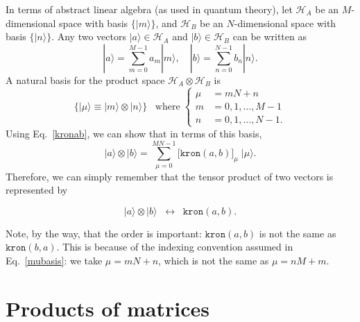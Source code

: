 \documentclass[pra,12pt]{revtex4}
\begin{document}
In terms of abstract linear algebra (as used in quantum theory), let
$\mathscr{H}_A$ be an $M$-dimensional space with basis
$\{|m\rangle\}$, and $\mathscr{H}_B$ be an $N$-dimensional space with
basis $\{|n\rangle\}$.  Any two vectors $|a\rangle \in \mathscr{H}_A$
and $|b\rangle \in \mathscr{H}_B$ can be written as
\begin{equation}
  |a\rangle = \sum_{m=0}^{M-1} a_m |m\rangle, \quad |b\rangle = \sum_{n=0}^{N-1} b_n |n\rangle.
\end{equation}
A natural basis for the product space $\mathscr{H}_A\otimes
\mathscr{H}_B$ is
\begin{equation}
  \Big\{|\mu\rangle \equiv |m\rangle\otimes |n\rangle\Big\} \;\;\;\mathrm{where} \;\begin{cases}\mu\!\!\!\! &= mN+n \\ m \!\!\!\!&= 0,1,\dots,M-1 \\ n \!\!\!\!&= 0,1, \dots, N-1.\end{cases}
  \label{mubasis}
\end{equation}
Using Eq.~\eqref{kronab}, we can show that in terms of this basis,
\begin{equation}
  |a\rangle\otimes|b\rangle = \sum_{\mu=0}^{MN-1} \big[\texttt{kron}(a,b)\big]_\mu \; |\mu\rangle.
\end{equation}
Therefore, we can simply remember that the tensor product of two
vectors is represented by
\begin{framed}
  \begin{equation}
    |a\rangle\otimes|b\rangle \;\;\leftrightarrow\;\;
    \texttt{kron}(a,b).
    \label{result1}
  \end{equation}
\end{framed}
\vskip -0.15in
\noindent
Note, by the way, that the order is important: $\texttt{kron}(a,b)$ is
not the same as $\texttt{kron}(b,a)$.  This is because of the indexing
convention assumed in Eq.~\eqref{mubasis}: we take $\mu = mN+n$, which
is not the same as $\mu = nM+m$.

\section{Products of matrices}
\end{document}
